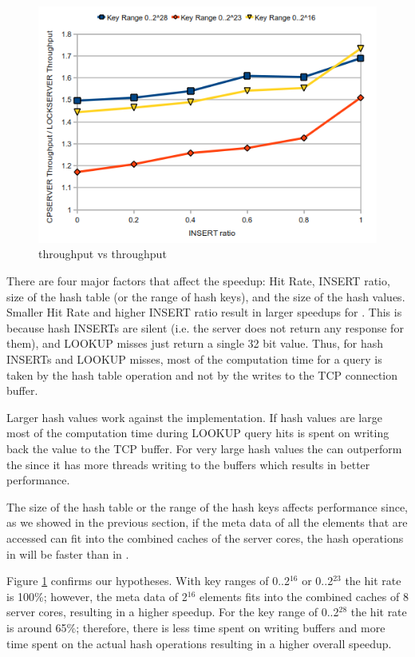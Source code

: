 \begin{figure}[!ht]
  \centering
  \includegraphics[width=\linewidth]{figs/cpserverspeedup.png}
  \caption{\cpserver{} throughput vs \lockserver{} throughput}
  \label{fig:cpserverspeedup}
\end{figure}

There are four major factors that affect the speedup: Hit Rate, INSERT ratio, size of the hash table (or the range of hash keys), and the size of the hash values. 
Smaller Hit Rate and higher INSERT ratio result in larger speedups for \cpserver{}. This is because hash INSERTs are silent (i.e. the server does not return 
any response for them), and LOOKUP misses just return a single 32 bit value. Thus, for hash INSERTs and LOOKUP misses, most of the computation time for a query is taken by 
the hash table operation and not by the writes to the TCP connection buffer. 

Larger hash values work against the \cpserver{} implementation. If hash values are large most of the computation time during LOOKUP query hits is spent on 
writing back the value to the TCP buffer. For very large hash values the \lockserver{} can outperform the \cpserver{} since it has more threads 
writing to the buffers which results in better performance.

The size of the hash table or the range of the hash keys affects performance since, as we showed in the previous section, if the meta data of all the elements 
that are accessed can fit into the combined caches of the server cores, the hash operations in \cphash{} will be faster than in \lockhash{}.

Figure \ref{fig:cpserverspeedup} confirms our hypotheses. With key ranges of 0..2$^{16}$ or 0..2$^{23}$ the hit rate is 100\%; however, the meta data of 
2$^{16}$ elements fits into the combined caches of 8 server cores, resulting in a higher speedup. For the key range of 0..2$^{28}$ the hit rate is around 65\%; 
therefore, there is less time spent on writing buffers and more time spent on the actual hash operations resulting in a higher overall speedup.


